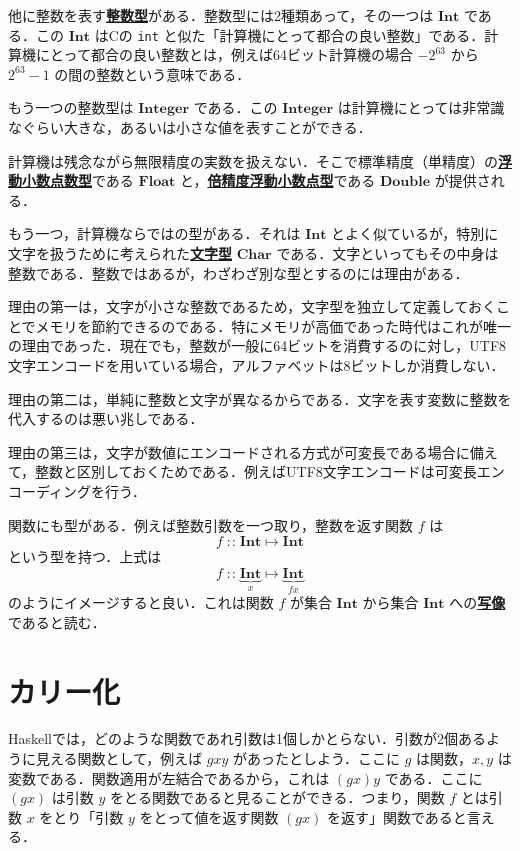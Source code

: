 \documentclass[a4paper,twocolumn]{jsbook}
\newcommand{\programminglanguage}[1]{\textsf{#1}}
\newcommand{\clang}{\programminglanguage{C}}
\newcommand{\haskell}{\programminglanguage{Haskell}}
\newcommand{\keyword}[1]{{\underline{\textbf{#1}}}}
\newcommand{\code}[1]{\texttt{#1}}
\DeclareMathOperator{\mIn}{{:\!:}}
\DeclareMathOperator{\mMapsTo}{\mapsto}
\newcommand{\mType}[1]{\mathbf{#1}}
\newcommand{\mCharType}{\mType{Char}}
\newcommand{\mFloatType}{\mType{Float}}
\newcommand{\mDoubleType}{\mType{Double}}
\newcommand{\mIntType}{\mType{Int}}
\newcommand{\mIntegerType}{\mType{Integer}}
\newcommand{\mProj}[2]{#1\mMapsTo#2}
\begin{document}
他に整数を表す\keyword{整数型}がある．整数型には2種類あって，その一つは $\mIntType$ である．この $\mIntType$ は\clang の \code{int} と似た「計算機にとって都合の良い整数」である．計算機にとって都合の良い整数とは，例えば64ビット計算機の場合 $-2^{63}$ から $2^{63}-1$ の間の整数という意味である．

もう一つの整数型は $\mIntegerType$ である．この $\mIntegerType$ は計算機にとっては非常識なぐらい大きな，あるいは小さな値を表すことができる．

計算機は残念ながら無限精度の実数を扱えない．そこで標準精度（単精度）の\keyword{浮動小数点数型}である $\mFloatType$ と，\keyword{倍精度浮動小数点型}である $\mDoubleType$ が提供される．

もう一つ，計算機ならではの型がある．それは $\mIntType$ とよく似ているが，特別に文字を扱うために考えられた\keyword{文字型} $\mCharType$ である．文字といってもその中身は整数である．整数ではあるが，わざわざ別な型とするのには理由がある．

理由の第一は，文字が小さな整数であるため，文字型を独立して定義しておくことでメモリを節約できるのである．特にメモリが高価であった時代はこれが唯一の理由であった．現在でも，整数が一般に64ビットを消費するのに対し，UTF8文字エンコードを用いている場合，アルファベットは8ビットしか消費しない．

理由の第二は，単純に整数と文字が異なるからである．文字を表す変数に整数を代入するのは悪い兆しである．

理由の第三は，文字が数値にエンコードされる方式が可変長である場合に備えて，整数と区別しておくためである．例えばUTF8文字エンコードは可変長エンコーディングを行う．

関数にも型がある．例えば整数引数を一つ取り，整数を返す関数 $f$ は
\begin{equation}
f\mIn\mProj{\mIntType}{\mIntType}
\end{equation}
という型を持つ．上式は
\begin{equation}
f
\mIn\underbrace{\mIntType}_{x}
\mMapsTo
\underbrace{\mIntType}_{fx}
\end{equation}
のようにイメージすると良い．これは関数 $f$ が集合 $\mIntType$ から集合 $\mIntType$ への\keyword{写像}であると読む．

\section{カリー化}

\haskell では，どのような関数であれ引数は1個しかとらない．引数が2個あるように見える関数として，例えば $gxy$ があったとしよう．ここに $g$ は関数，$x,y$ は変数である．関数適用が左結合であるから，これは $\left(gx\right)y$ である．ここに $\left(gx\right)$ は引数 $y$ をとる関数であると見ることができる．つまり，関数 $f$ とは引数 $x$ をとり「引数 $y$ をとって値を返す関数 $\left(gx\right)$ を返す」関数であると言える．
\end{document}
